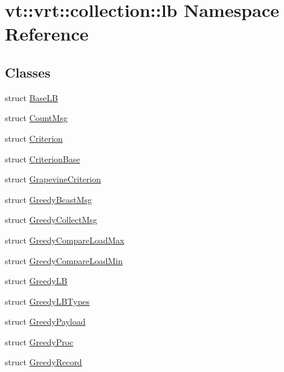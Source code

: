 \hypertarget{namespacevt_1_1vrt_1_1collection_1_1lb}{}\section{vt\+:\+:vrt\+:\+:collection\+:\+:lb Namespace Reference}
\label{namespacevt_1_1vrt_1_1collection_1_1lb}
\subsection*{Classes}
\begin{DoxyCompactItemize}
\item 
struct \hyperlink{structvt_1_1vrt_1_1collection_1_1lb_1_1_base_l_b}{Base\+LB}
\item 
struct \hyperlink{structvt_1_1vrt_1_1collection_1_1lb_1_1_count_msg}{Count\+Msg}
\item 
struct \hyperlink{structvt_1_1vrt_1_1collection_1_1lb_1_1_criterion}{Criterion}
\item 
struct \hyperlink{structvt_1_1vrt_1_1collection_1_1lb_1_1_criterion_base}{Criterion\+Base}
\item 
struct \hyperlink{structvt_1_1vrt_1_1collection_1_1lb_1_1_grapevine_criterion}{Grapevine\+Criterion}
\item 
struct \hyperlink{structvt_1_1vrt_1_1collection_1_1lb_1_1_greedy_bcast_msg}{Greedy\+Bcast\+Msg}
\item 
struct \hyperlink{structvt_1_1vrt_1_1collection_1_1lb_1_1_greedy_collect_msg}{Greedy\+Collect\+Msg}
\item 
struct \hyperlink{structvt_1_1vrt_1_1collection_1_1lb_1_1_greedy_compare_load_max}{Greedy\+Compare\+Load\+Max}
\item 
struct \hyperlink{structvt_1_1vrt_1_1collection_1_1lb_1_1_greedy_compare_load_min}{Greedy\+Compare\+Load\+Min}
\item 
struct \hyperlink{structvt_1_1vrt_1_1collection_1_1lb_1_1_greedy_l_b}{Greedy\+LB}
\item 
struct \hyperlink{structvt_1_1vrt_1_1collection_1_1lb_1_1_greedy_l_b_types}{Greedy\+L\+B\+Types}
\item 
struct \hyperlink{structvt_1_1vrt_1_1collection_1_1lb_1_1_greedy_payload}{Greedy\+Payload}
\item 
struct \hyperlink{structvt_1_1vrt_1_1collection_1_1lb_1_1_greedy_proc}{Greedy\+Proc}
\item 
struct \hyperlink{structvt_1_1vrt_1_1collection_1_1lb_1_1_greedy_record}{Greedy\+Record}
\item 

\end{DoxyCompactItemize}

